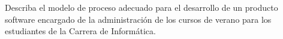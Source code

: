 Describa el modelo de proceso adecuado para el desarrollo de un producto software encargado de la administración de los cursos de verano para los estudiantes de la Carrera de Informática.

